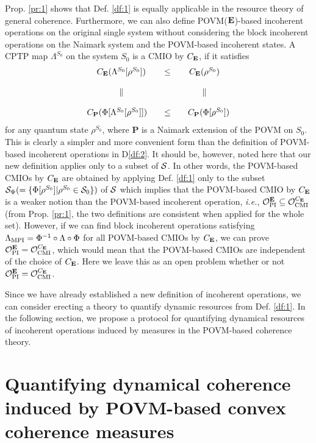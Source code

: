 \documentclass[american,aps,pra,reprint, superscriptaddress]{revtex4-1}
\def\be{\begin{equation}}
\def\ee{\end{equation}}
\theoremstyle{plain}
\def\bP{\mathbf{P}}\def\bQ{\mathbf{Q}}\def\bR{\mathbf{R}}\def\bS{\mathbf{S}}\def\bT{\mathbf{T}}
\def\mCMI{\textmd{CMI}} \def\mI{\textmd{I}} \def\mPI{\textmd{PI}}
\theoremstyle{definition}
\theoremstyle{remark}
\begin{document}
Prop. \ref{pr:1} shows that Def. \ref{df:1} is equally applicable in the resource theory of general coherence. Furthermore, we can also define POVM($\mathbf{E}$)-based incoherent operations on the original single system without considering the block incoherent operations on the Naimark system and the POVM-based incoherent states. A CPTP map $\Lambda^{S_0}$ on the system $S_0$ is a CMIO by $C_{\mathbf{E}}$, if it satisfies
\be\label{eq:4}
\begin{array}{ccc}
  C_{\bE}(\Lambda^{S_0}[\rho^{S_0}]) & \leq &  C_{\bE}(\rho^{S_0})\\
    & &  \\
  \parallel & &  \parallel\\
    & &  \\
  C_{\bP}(\Phi[\Lambda^{S_0}[\rho^{S_0}]])\quad & \leq & \quad C_{\bP}(\Phi[\rho^{S_0}])
  \end{array}
\ee
for any quantum state $\rho^{S_0}$, where $\bP$ is a Naimark extension of the POVM on $S_0$. This is clearly a simpler and more convenient form than the definition of POVM-based incoherent operations in D\ref{df:2}.
It should be, however, noted here that our new definition applies only to a subset of $\mathcal{S}$. In other words, the POVM-based CMIOs by $C_{\mathbf{E}}$ are obtained by applying Def. \ref{df:1} only to the subset $\mathcal{S}_{\Phi}(=\{\Phi[\rho^{S_0}]|\rho^{S_0} \in \mathcal{S}_{0}\})$ of $\mathcal{S}$ which implies that the POVM-based CMIO by $C_{\mathbf{E}}$ is a weaker notion than the POVM-based incoherent operation, \emph{i.e.}, $\cO_{\mPI}^{\bE} \subseteq \cO_{\mCMI}^{C_{\bE}}$ (from Prop. \ref{pr:1}, the two definitions are consistent when applied for the whole set). However, if we can find block incoherent operations satisfying $\Lambda_{\textmd{MPI}} = \Phi^{-1}\circ \Lambda\circ \Phi$ for all POVM-based CMIOs by $C_{\mathbf{E}}$, we can prove $\cO_{\mPI}^{\bE} = \cO_{\mCMI}^{C_{\bE}}$, which would mean that the POVM-based CMIOs are independent of the choice of $C_{\mathbf{E}}$. Here we leave this as an open problem whether or not $\cO_{\mPI}^{\bE} = \cO_{\mCMI}^{C_{\bE}}$.

Since we have already established a new definition of incoherent operations, we can consider erecting a theory to quantify dynamic resources from Def. \ref{df:1}.
In the following section, we propose a protocol for quantifying dynamical resources of incoherent operations induced by measures in the POVM-based coherence theory.

\section{Quantifying dynamical coherence induced by POVM-based convex coherence measures}
\end{document}
